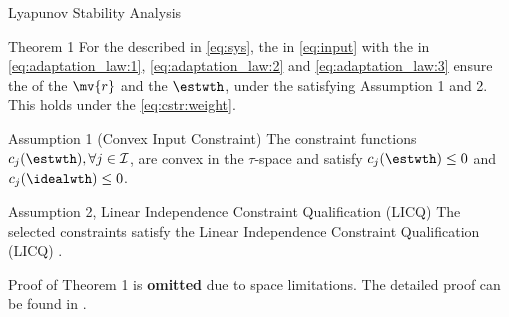 \documentclass[8pt, aspectratio=169, handout]{beamer}
\newcommand{\ctxt}[2]{\color{#1}{#2}\color{black}}
\begin{document}
\begin{frame}{\insertsubsectionhead}{Lyapunov Stability Analysis}

  \centering
  \begin{minipage}{.9\textwidth}

    \begin{block}{Theorem 1 \cite{Ryu:2025aa}}
      For the \ctxt{airforceblue}{dynamical system } described in \eqref{eq:sys}, the \ctxt{awesome}{neuro-adaptive controller } in \eqref{eq:input} with the \ctxt{airforceblue}{weight adaptation laws } in \eqref{eq:adaptation_law:1}, \eqref{eq:adaptation_law:2} and \eqref{eq:adaptation_law:3} ensure the \ctxt{airforceblue}{boundedness } of the \ctxt{awesome}{filtered error } $\mv{r}$ and the \ctxt{awesome}{weight estimate } $\estwth$, under the \ctxt{airforceblue}{control input constraints} satisfying Assumption 1 and 2. This holds under the \ctxt{awesome}{weight norm constraint } \eqref{eq:cstr:weight}.
    \end{block}

    \begin{exampleblock}{Assumption 1 (Convex Input Constraint)}
      The constraint functions $c_j(\estwth),\forall j\in\mathcal{I}$, are convex in the $\tau$-space and satisfy $c_j(\estwth)\le0$ and $c_j(\idealwth)\le0$.
    \end{exampleblock}

    \begin{exampleblock}{Assumption 2, Linear Independence Constraint Qualification (LICQ)}
      The selected constraints satisfy the Linear Independence Constraint Qualification (LICQ) \cite[Chap. 12 Def. 12.1]{Nocedal:2006aa}.
    \end{exampleblock}

  \end{minipage}

  \vspace{.2cm}

  Proof of Theorem 1 is \textbf{omitted } due to space limitations. The detailed proof can be found in \cite{Ryu:2025aa}.

\end{frame}

\end{document}
